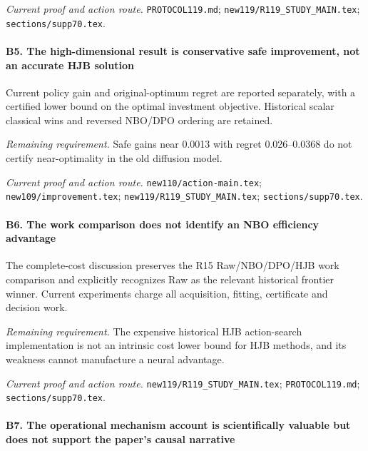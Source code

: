 \par\emph{Current proof and action route.} \nolinkurl{PROTOCOL119.md}; \nolinkurl{new119/R119_STUDY_MAIN.tex}; \nolinkurl{sections/supp70.tex}.

\paragraph{B5. The high-dimensional result is conservative safe improvement, not an accurate HJB solution}

Current policy gain and original-optimum regret are reported separately, with a certified lower bound on the optimal investment objective. Historical scalar classical wins and reversed NBO/\allowbreak{}DPO ordering are retained.

\par\emph{Remaining requirement.} Safe gains near 0.0013 with regret 0.026--0.0368 do not certify near-optimality in the old diffusion model.

\par\emph{Current proof and action route.} \nolinkurl{new110/action-main.tex}; \nolinkurl{new109/improvement.tex}; \nolinkurl{new119/R119_STUDY_MAIN.tex}; \nolinkurl{sections/supp70.tex}.

\paragraph{B6. The work comparison does not identify an NBO efficiency advantage}

The complete-cost discussion preserves the R15 Raw/\allowbreak{}NBO/\allowbreak{}DPO/\allowbreak{}HJB work comparison and explicitly recognizes Raw as the relevant historical frontier winner. Current experiments charge all acquisition, fitting, certificate and decision work.

\par\emph{Remaining requirement.} The expensive historical HJB action-search implementation is not an intrinsic cost lower bound for HJB methods, and its weakness cannot manufacture a neural advantage.

\par\emph{Current proof and action route.} \nolinkurl{new119/R119_STUDY_MAIN.tex}; \nolinkurl{PROTOCOL119.md}; \nolinkurl{sections/supp70.tex}.

\paragraph{B7. The operational mechanism account is scientifically valuable but does not support the paper's causal narrative}

